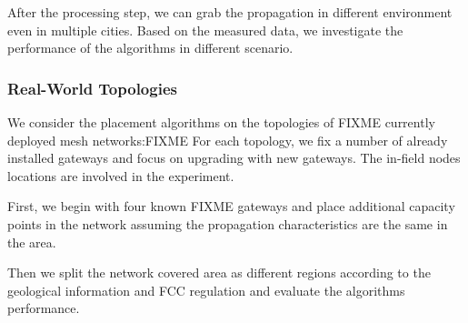 After the processing step, we can grab the propagation in different environment even in multiple cities. Based on the measured data, we investigate the performance of the algorithms in different scenario.

\subsubsection{Real-World Topologies}
We consider the placement algorithms on the topologies of FIXME currently deployed mesh networks:FIXME
For each topology, we fix a number of already installed gateways and focus on upgrading with new gateways.
The in-field nodes locations are involved in the experiment.

First, we begin with four known FIXME gateways and place additional capacity points in the network assuming the propagation characteristics are the same in the area.


Then we split the network covered area as different regions according to the geological information and FCC regulation and evaluate the algorithms performance.







